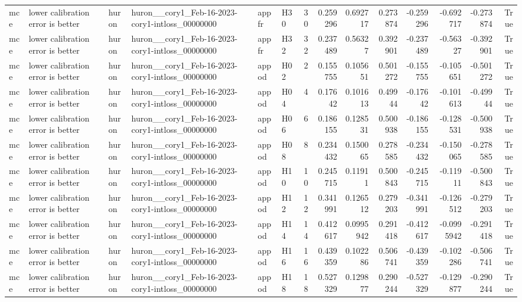 \begin{longtable}{llllllrrrrrrrr}
mce & lower calibration error is better & huron & huron\_\_cory1\_Feb-16-2023-cory1-intloss\_00000000 & appfr & H30 & 30 & 0.259296 & 0.692717 & 0.273874 & -0.259296 & -0.692717 & -0.273874 & True \\
mce & lower calibration error is better & huron & huron\_\_cory1\_Feb-16-2023-cory1-intloss\_00000000 & appfr & H32 & 32 & 0.237489 & 0.56327 & 0.392901 & -0.237489 & -0.56327 & -0.392901 & True \\
mce & lower calibration error is better & huron & huron\_\_cory1\_Feb-16-2023-cory1-intloss\_00000000 & appod & H02 & 2 & 0.155755 & 0.105651 & 0.501272 & -0.155755 & -0.105651 & -0.501272 & True \\
mce & lower calibration error is better & huron & huron\_\_cory1\_Feb-16-2023-cory1-intloss\_00000000 & appod & H04 & 4 & 0.17642 & 0.101613 & 0.49944 & -0.17642 & -0.101613 & -0.49944 & True \\
mce & lower calibration error is better & huron & huron\_\_cory1\_Feb-16-2023-cory1-intloss\_00000000 & appod & H06 & 6 & 0.186155 & 0.128531 & 0.500938 & -0.186155 & -0.128531 & -0.500938 & True \\
mce & lower calibration error is better & huron & huron\_\_cory1\_Feb-16-2023-cory1-intloss\_00000000 & appod & H08 & 8 & 0.234432 & 0.150065 & 0.278585 & -0.234432 & -0.150065 & -0.278585 & True \\
mce & lower calibration error is better & huron & huron\_\_cory1\_Feb-16-2023-cory1-intloss\_00000000 & appod & H10 & 10 & 0.245715 & 0.11911 & 0.500843 & -0.245715 & -0.11911 & -0.500843 & True \\
mce & lower calibration error is better & huron & huron\_\_cory1\_Feb-16-2023-cory1-intloss\_00000000 & appod & H12 & 12 & 0.341991 & 0.126512 & 0.279203 & -0.341991 & -0.126512 & -0.279203 & True \\
mce & lower calibration error is better & huron & huron\_\_cory1\_Feb-16-2023-cory1-intloss\_00000000 & appod & H14 & 14 & 0.412617 & 0.0995942 & 0.291418 & -0.412617 & -0.0995942 & -0.291418 & True \\
mce & lower calibration error is better & huron & huron\_\_cory1\_Feb-16-2023-cory1-intloss\_00000000 & appod & H16 & 16 & 0.439359 & 0.102286 & 0.506741 & -0.439359 & -0.102286 & -0.506741 & True \\
mce & lower calibration error is better & huron & huron\_\_cory1\_Feb-16-2023-cory1-intloss\_00000000 & appod & H18 & 18 & 0.527329 & 0.129877 & 0.290244 & -0.527329 & -0.129877 & -0.290244 & True \\

\end{longtable}
